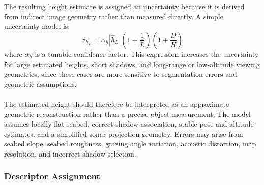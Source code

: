 \\ \\
The resulting height estimate is assigned an uncertainty because it is derived from indirect image geometry rather than measured directly. A simple uncertainty model is:
\begin{equation}
    \sigma_{h_L}
    =
    \alpha_h
    |\hat{h}_L|
    \left(1 + \frac{1}{L}\right)
    \left(1 + \frac{D}{H}\right)
    \label{eq:local-map-generation-landmark-height-uncertainty}
\end{equation}
where $\alpha_h$ is a tunable confidence factor. This expression increases the uncertainty for large estimated heights, short shadows, and long-range or low-altitude viewing geometries, since these cases are more sensitive to segmentation errors and geometric assumptions.
\\ \\
The estimated height should therefore be interpreted as an approximate geometric reconstruction rather than a precise object measurement. The model assumes locally flat seabed, correct shadow association, stable pose and altitude estimates, and a simplified sonar projection geometry. Errors may arise from seabed slope, seabed roughness, grazing angle variation, acoustic distortion, map resolution, and incorrect shadow selection.



\newpage



\subsubsection{Descriptor Assignment}
